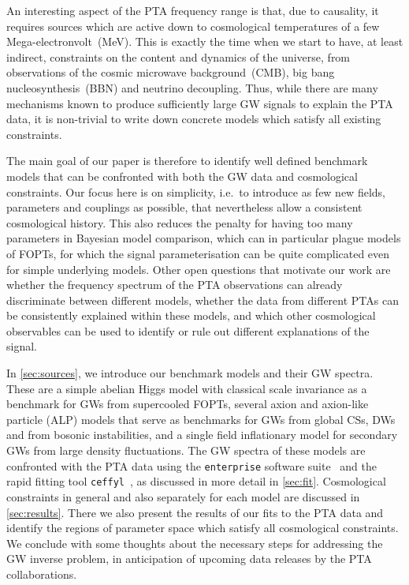 \documentclass{article}
\begin{document}
An interesting aspect of the PTA frequency range is that, due to causality, it requires sources which are active down to cosmological temperatures of a few Mega-electronvolt~(MeV). This is exactly the time when we start to have, at least indirect, constraints on the content and dynamics of the universe, from observations of the cosmic microwave background~(CMB), big bang nucleosynthesis~(BBN) and neutrino decoupling. Thus, while there are many mechanisms known to produce sufficiently large GW signals to explain the PTA data, it is non-trivial to write down concrete models which satisfy all existing constraints. 

The main goal of our paper is therefore to identify well defined benchmark models that can be confronted with both the GW data and cosmological constraints. Our focus here is on simplicity, i.e.\ to introduce as few new fields, parameters and couplings as possible, that nevertheless allow a consistent cosmological history. This also reduces the penalty for having too many parameters in Bayesian model comparison, which can in particular plague models of FOPTs, for which the signal parameterisation can be quite complicated even for simple underlying models. 
Other open questions that motivate our work are whether the frequency spectrum of the PTA observations can already discriminate between different models, whether the data from different PTAs can be consistently explained within these models, and which other cosmological observables can be used to identify or rule out different explanations of the signal. 

In \cref{sec:sources}, we introduce our benchmark models and their GW spectra. These are a simple abelian Higgs model with classical scale invariance as a benchmark for GWs from supercooled FOPTs, several axion and axion-like particle (ALP) models that serve as benchmarks for GWs from global CSs, DWs and from bosonic instabilities, and a single field inflationary model for secondary GWs from large density fluctuations. The GW spectra of these models are confronted with the PTA data using the \texttt{enterprise} software suite~\cite{enterprise,enterprise_extensions} and the rapid fitting tool \texttt{ceffyl}~\cite{Lamb:2023jls}, as discussed in more detail in \cref{sec:fit}. Cosmological constraints in general and also separately for each model are discussed in \cref{sec:results}. There we also present the results of our fits to the PTA data and identify the regions of parameter space which satisfy all cosmological constraints. We conclude with some thoughts about the necessary steps for addressing the GW inverse problem, in anticipation of upcoming data releases by the PTA collaborations. 
\end{document}

